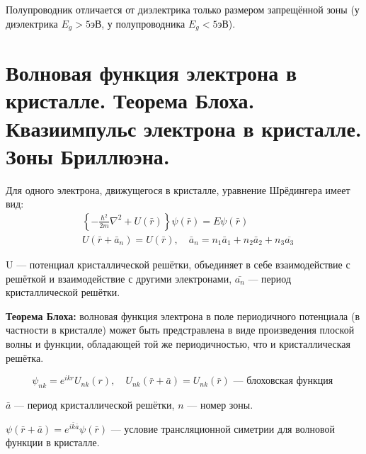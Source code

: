 Полупроводник отличается от диэлектрика только размером запрещённой зоны (у диэлектрика $E_g > 5$эВ, у полупроводника $E_g < 5$эВ).


\section{Волновая функция электрона в кристалле. Теорема Блоха. Квазиимпульс электрона в кристалле. Зоны Бриллюэна.}

Для одного электрона, движущегося в кристалле, уравнение Шрёдингера имеет вид:
$$
\begin{aligned}
& \left\{-\frac{\hbar^{2}}{2 m} \nabla^{2}+U(\bar{r})\right\} \psi(\bar{r})=E \psi(\bar{r}) \\
& U\left(\bar{r}+\bar{a}_{n}\right)=U(\bar{r}), \quad \bar{a}_{n}=n_{1} \bar{a}_{1}+n_{2} \bar{a}_{2}+n_{3} \overline{a_{3}}
\end{aligned}
$$

\noindent U --- потенциал кристаллической решётки, объединяет в себе взаимодействие с решёткой и взаимодействие с другими электронами, $\bar{a_n}$ --- период кристаллической решётки. 

\textbf{Теорема Блоха:} волновая функция электрона в поле периодичного потенциала (в частности в кристалле) может быть предстравлена в виде произведения плоской волны и функции, обладающей той же периодичностью, что и кристаллическая решётка.

$$
\psi_{n k}=e^{i k r} U_{n k}(r), \quad U_{n k}(\bar{r}+\bar{a})=U_{n k}(\bar{r}) \text { --- блоховская функция }
$$

\noindent $\bar{a}$ --- период кристаллической решётки, $n$ --- номер зоны.

$\psi(\bar{r}+\bar{a})=e^{i \bar{k} \bar{a}} \psi(\bar{r})$ --- условие трансляционной симетрии для волновой функции в кристалле.




